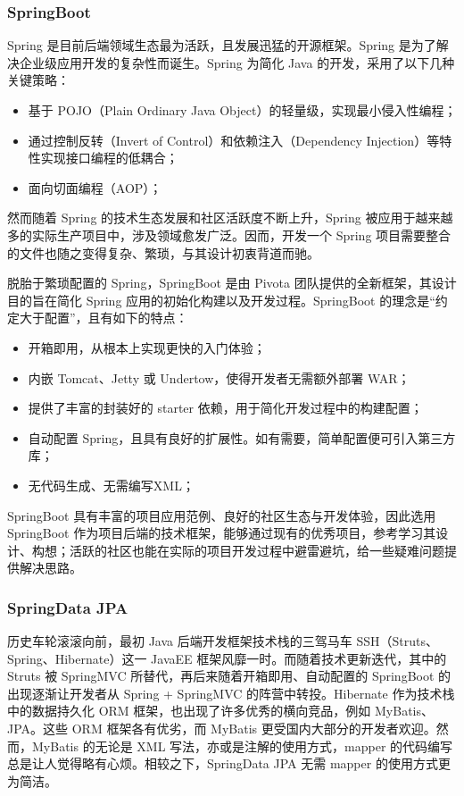 \subsubsection{SpringBoot}
Spring 是目前后端领域生态最为活跃，且发展迅猛的开源框架。Spring 是为了解决企业级应用开发的复杂性而诞生。Spring 为简化 Java 的开发，采用了以下几种关键策略：
\begin{itemize}
    \item 基于 POJO（Plain Ordinary Java Object）的轻量级，实现最小侵入性编程；
    \item 通过控制反转（Invert of Control）和依赖注入（Dependency Injection）等特性实现接口编程的低耦合；
    \item 面向切面编程（AOP）；
\end{itemize}
然而随着 Spring 的技术生态发展和社区活跃度不断上升，Spring 被应用于越来越多的实际生产项目中，涉及领域愈发广泛。因而，开发一个 Spring 项目需要整合的文件也随之变得复杂、繁琐，与其设计初衷背道而驰。

脱胎于繁琐配置的 Spring，SpringBoot 是由 Pivota 团队提供的全新框架，其设计目的旨在简化 Spring 应用的初始化构建以及开发过程。SpringBoot 的理念是“约定大于配置”，且有如下的特点：
\begin{itemize}
    \item 开箱即用，从根本上实现更快的入门体验；
    \item 内嵌 Tomcat、Jetty 或 Undertow，使得开发者无需额外部署 WAR；
    \item 提供了丰富的封装好的 starter 依赖，用于简化开发过程中的构建配置；
    \item 自动配置 Spring，且具有良好的扩展性。如有需要，简单配置便可引入第三方库；
    \item 无代码生成、无需编写XML；
\end{itemize}

SpringBoot 具有丰富的项目应用范例、良好的社区生态与开发体验，因此选用 SpringBoot 作为项目后端的技术框架，能够通过现有的优秀项目，参考学习其设计、构想；活跃的社区也能在实际的项目开发过程中避雷避坑，给一些疑难问题提供解决思路。

\subsubsection{SpringData JPA}
历史车轮滚滚向前，最初 Java 后端开发框架技术栈的三驾马车 SSH（Struts、Spring、Hibernate）这一 JavaEE 框架风靡一时。而随着技术更新迭代，其中的 Struts 被 SpringMVC 所替代，再后来随着开箱即用、自动配置的 SpringBoot 的出现逐渐让开发者从 Spring + SpringMVC 的阵营中转投。Hibernate 作为技术栈中的数据持久化 ORM 框架，也出现了许多优秀的横向竞品，例如 MyBatis、JPA。这些 ORM 框架各有优劣，而 MyBatis 更受国内大部分的开发者欢迎。然而，MyBatis 的无论是 XML 写法，亦或是注解的使用方式，mapper 的代码编写总是让人觉得略有心烦。相较之下，SpringData JPA 无需 mapper 的使用方式更为简洁。

